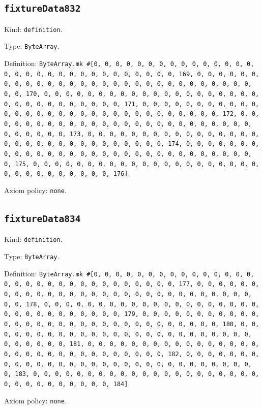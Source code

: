 \documentclass[11pt]{article}
\begin{document}
\subsection*{\texttt{fixtureData832}}
\noindent Kind: \texttt{definition}.\par
\noindent Type: \texttt{ByteArray}.\par
\noindent Definition: \texttt{ByteArray.mk \#[0, 0, 0, 0, 0, 0, 0, 0, 0, 0, 0, 0, 0, 0, 0, 0, 0, 0, 0, 0, 0, 0, 0, 0, 0, 0, 0, 0, 0, 0, 0, 169, 0, 0, 0, 0, 0, 0, 0, 0, 0, 0, 0, 0, 0, 0, 0, 0, 0, 0, 0, 0, 0, 0, 0, 0, 0, 0, 0, 0, 0, 0, 0, 170, 0, 0, 0, 0, 0, 0, 0, 0, 0, 0, 0, 0, 0, 0, 0, 0, 0, 0, 0, 0, 0, 0, 0, 0, 0, 0, 0, 0, 0, 0, 0, 171, 0, 0, 0, 0, 0, 0, 0, 0, 0, 0, 0, 0, 0, 0, 0, 0, 0, 0, 0, 0, 0, 0, 0, 0, 0, 0, 0, 0, 0, 0, 0, 172, 0, 0, 0, 0, 0, 0, 0, 0, 0, 0, 0, 0, 0, 0, 0, 0, 0, 0, 0, 0, 0, 0, 0, 0, 0, 0, 0, 0, 0, 0, 0, 173, 0, 0, 0, 0, 0, 0, 0, 0, 0, 0, 0, 0, 0, 0, 0, 0, 0, 0, 0, 0, 0, 0, 0, 0, 0, 0, 0, 0, 0, 0, 0, 174, 0, 0, 0, 0, 0, 0, 0, 0, 0, 0, 0, 0, 0, 0, 0, 0, 0, 0, 0, 0, 0, 0, 0, 0, 0, 0, 0, 0, 0, 0, 0, 175, 0, 0, 0, 0, 0, 0, 0, 0, 0, 0, 0, 0, 0, 0, 0, 0, 0, 0, 0, 0, 0, 0, 0, 0, 0, 0, 0, 0, 0, 0, 0, 176]}.\par
\noindent Axiom policy: \texttt{none}.\par
\subsection*{\texttt{fixtureData834}}
\noindent Kind: \texttt{definition}.\par
\noindent Type: \texttt{ByteArray}.\par
\noindent Definition: \texttt{ByteArray.mk \#[0, 0, 0, 0, 0, 0, 0, 0, 0, 0, 0, 0, 0, 0, 0, 0, 0, 0, 0, 0, 0, 0, 0, 0, 0, 0, 0, 0, 0, 0, 0, 177, 0, 0, 0, 0, 0, 0, 0, 0, 0, 0, 0, 0, 0, 0, 0, 0, 0, 0, 0, 0, 0, 0, 0, 0, 0, 0, 0, 0, 0, 0, 0, 178, 0, 0, 0, 0, 0, 0, 0, 0, 0, 0, 0, 0, 0, 0, 0, 0, 0, 0, 0, 0, 0, 0, 0, 0, 0, 0, 0, 0, 0, 0, 0, 179, 0, 0, 0, 0, 0, 0, 0, 0, 0, 0, 0, 0, 0, 0, 0, 0, 0, 0, 0, 0, 0, 0, 0, 0, 0, 0, 0, 0, 0, 0, 0, 180, 0, 0, 0, 0, 0, 0, 0, 0, 0, 0, 0, 0, 0, 0, 0, 0, 0, 0, 0, 0, 0, 0, 0, 0, 0, 0, 0, 0, 0, 0, 0, 181, 0, 0, 0, 0, 0, 0, 0, 0, 0, 0, 0, 0, 0, 0, 0, 0, 0, 0, 0, 0, 0, 0, 0, 0, 0, 0, 0, 0, 0, 0, 0, 182, 0, 0, 0, 0, 0, 0, 0, 0, 0, 0, 0, 0, 0, 0, 0, 0, 0, 0, 0, 0, 0, 0, 0, 0, 0, 0, 0, 0, 0, 0, 0, 183, 0, 0, 0, 0, 0, 0, 0, 0, 0, 0, 0, 0, 0, 0, 0, 0, 0, 0, 0, 0, 0, 0, 0, 0, 0, 0, 0, 0, 0, 0, 0, 184]}.\par
\noindent Axiom policy: \texttt{none}.\par
\end{document}
